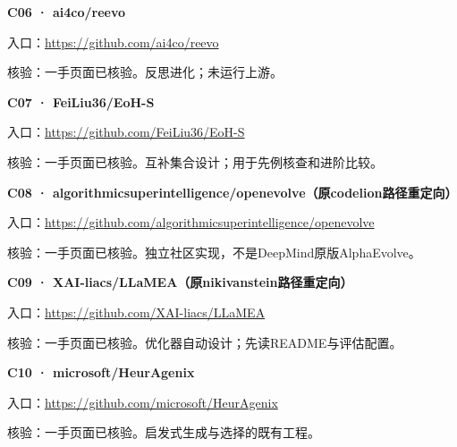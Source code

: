 \par\noindent\begin{minipage}{\linewidth}
\textbf{C06 · ai4co/reevo}

入口：\url{https://github.com/ai4co/reevo}

核验：一手页面已核验。反思进化；未运行上游。
\end{minipage}\par\vspace{6pt}

\par\noindent\begin{minipage}{\linewidth}
\textbf{C07 · FeiLiu36/EoH-S}

入口：\url{https://github.com/FeiLiu36/EoH-S}

核验：一手页面已核验。互补集合设计；用于先例核查和进阶比较。
\end{minipage}\par\vspace{6pt}

\par\noindent\begin{minipage}{\linewidth}
\textbf{C08 ·
algorithmicsuperintelligence/openevolve（原codelion路径重定向）}

入口：\url{https://github.com/algorithmicsuperintelligence/openevolve}

核验：一手页面已核验。独立社区实现，不是DeepMind原版AlphaEvolve。
\end{minipage}\par\vspace{6pt}

\par\noindent\begin{minipage}{\linewidth}
\textbf{C09 · XAI-liacs/LLaMEA（原nikivanstein路径重定向）}

入口：\url{https://github.com/XAI-liacs/LLaMEA}

核验：一手页面已核验。优化器自动设计；先读README与评估配置。
\end{minipage}\par\vspace{6pt}

\par\noindent\begin{minipage}{\linewidth}
\textbf{C10 · microsoft/HeurAgenix}

入口：\url{https://github.com/microsoft/HeurAgenix}

核验：一手页面已核验。启发式生成与选择的既有工程。
\end{minipage}\par\vspace{6pt}

